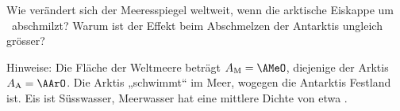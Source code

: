 Wie verändert sich der Meeresspiegel weltweit, wenn die arktische Eiskappe um \hEisO\ abschmilzt? Warum ist der Effekt beim Abschmelzen der Antarktis ungleich grösser?

Hinweise: Die Fläche der Weltmeere beträgt $A_\text{M} = \AMeO$, diejenige der Arktis $A_\text{A} = \AArO$. Die Arktis „schwimmt“ im Meer, wogegen die Antarktis Festland ist. Eis ist Süsswasser, Meerwasser hat eine mittlere Dichte von etwa \rhoMeO.
